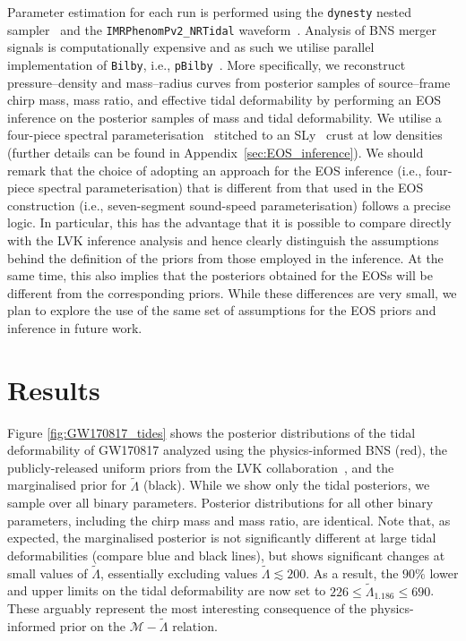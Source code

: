\documentclass[twocolumn]{aastex631}
\begin{document}
Parameter estimation for each run is performed using the \texttt{dynesty}
nested sampler~\citep{Dynesty} and the \texttt{IMRPhenomPv2\_NRTidal}
waveform~\citep{IMRPhenomP_NRtidal}. Analysis of BNS merger signals is
computationally expensive and as such we utilise parallel implementation
of \texttt{Bilby}, i.e., \texttt{pBilby}~\citep{pbilby}. More
specifically, we reconstruct pressure--density and mass--radius curves
from posterior samples of source--frame chirp mass, mass ratio, and
effective tidal deformability by performing an EOS inference on the
posterior samples of mass and tidal deformability. We utilise a
four-piece spectral parameterisation~\citep{Lindblom2010} stitched to an
SLy~\citep{2001_SLy_EOS} crust at low densities (further details can be
found in Appendix~\ref{sec:EOS_inference}). We should remark that the choice 
of adopting an approach for the EOS inference (i.e., four-piece spectral
parameterisation) that is different from that used in the EOS
construction (i.e., seven-segment sound-speed parameterisation) follows a
precise logic. In particular, this has the advantage that it is possible
to compare directly with the LVK inference analysis and hence clearly
distinguish the assumptions behind the definition of the priors from
those employed in the inference. At the same time, this also implies that
the posteriors obtained for the EOSs will be different from the
corresponding priors. While these differences are very small, we plan to
explore the use of the same set of assumptions for the EOS priors and
inference in future work.

\section{Results}
\label{sec:Results}
	
Figure \ref{fig:GW170817_tides} shows the posterior distributions of the
tidal deformability of GW170817 analyzed using the physics-informed BNS
(red), the publicly-released uniform priors from the LVK
collaboration~\citep[blue;][]{abbott17_170817observation}, and the
marginalised prior for $\tilde{\Lambda}$ (black). While we show only the
tidal posteriors, we sample over all binary parameters. Posterior
distributions for all other binary parameters, including the chirp mass
and mass ratio, are identical. Note that, as expected, the marginalised
posterior is not significantly different at large tidal deformabilities
(compare blue and black lines), but shows significant changes at small
values of $\tilde{\Lambda}$, essentially excluding values
$\tilde{\Lambda} \lesssim 200$. As a result, the $90\%$ lower and upper
limits on the tidal deformability are now set to $226 \leq
\tilde{\Lambda}_{1.186} \leq 690$. These arguably represent the most
interesting consequence of the physics-informed prior on the
$\mathcal{M}\!-\!\tilde{\Lambda}$ relation.
\end{document}
